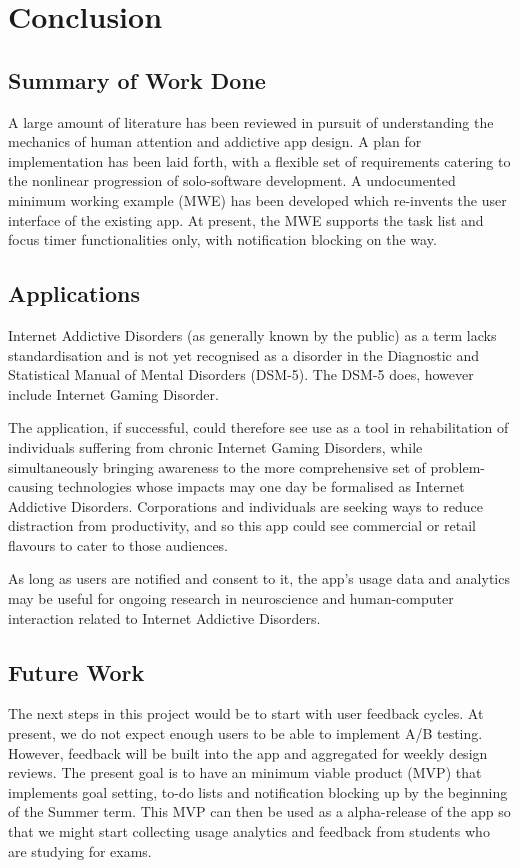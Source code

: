 \chapter{Conclusion}
\label{ch:conclusions}

\section{Summary of Work Done}
A large amount of literature has been reviewed in pursuit of understanding the mechanics of human attention and addictive app design. A plan for implementation has been laid forth, with a flexible set of requirements catering to the nonlinear progression of solo-software development. A undocumented minimum working example (MWE) has been developed which re-invents the user interface of the existing app. At present, the MWE supports the task list and focus timer functionalities only, with notification blocking on the way.

\section{Applications}
Internet Addictive Disorders (as generally known by the public) as a term lacks standardisation and is not yet recognised as a disorder in the Diagnostic and Statistical Manual of Mental Disorders (DSM-5). The DSM-5 does, however include Internet Gaming Disorder.

The application, if successful, could therefore see use as a tool in rehabilitation of individuals suffering from chronic Internet Gaming Disorders, while simultaneously bringing awareness to the more comprehensive set of problem-causing technologies whose impacts may one day be formalised as Internet Addictive Disorders. Corporations and individuals are seeking ways to reduce distraction from productivity, and so this app could see commercial or retail flavours to cater to those audiences.

As long as users are notified and consent to it, the app's usage data and analytics may be useful for ongoing research in neuroscience and human-computer interaction related to Internet Addictive Disorders.

\section{Future Work}
The next steps in this project would be to start with user feedback cycles. At present, we do not expect enough users to be able to implement A/B testing. However, feedback will be built into the app and aggregated for weekly design reviews. The present goal is to have an minimum viable product (MVP) that implements goal setting, to-do lists and notification blocking up by the beginning of the Summer term. This MVP can then be used as a alpha-release of the app so that we might start collecting usage analytics and feedback from students who are studying for exams.